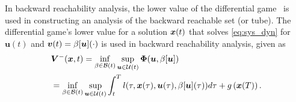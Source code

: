 In backward reachability analysis, the lower value of the differential game~\cite{Souganidis} is used in constructing an analysis of the backward reachable set (or tube). The differential game's lower value for a solution $\bm{x}(t)$ that solves \eqref{eq:sys_dyn} for $\bm{u}(t)$ and $\bm{v}(t) = \beta[\bm{u}](\cdot)$ is used in backward reachability analysis, given as
%
\begin{align}
	&\lowervalue(\state, t) = \inf_{\beta \in \mathcal{B}(t)} \sup_{\bm{u} \in \mathcal{U}(t)} \bm{\Phi}(\bm{u}, \beta[\bm{u}]) \nonumber \\
	&=  \inf_{\beta \in \mathcal{B}(t)} \sup_{\bm{u} \in \mathcal{U}(t)} %
	\int_{t}^{T} l(\tau, \bm{x}(\tau), \bm{u}(\tau), \beta[\bm{u}](\tau)) d\tau + g\left(\bm{x}(T)\right). %
	\label{eq:value_lower}
\end{align}
%
%



